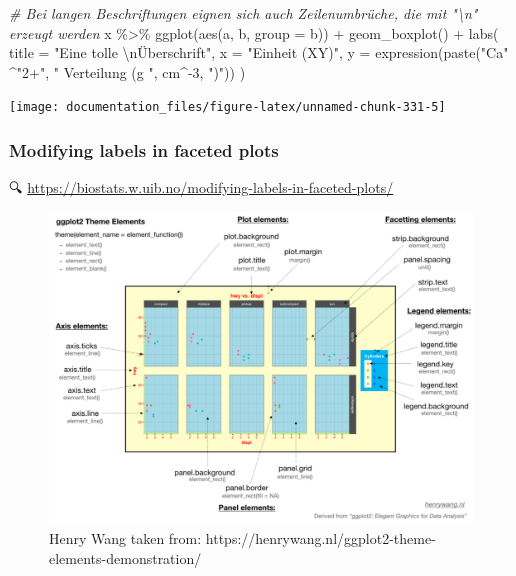 \documentclass[
]{article}
\newenvironment{Shaded}{\begin{snugshade}}{\end{snugshade}}
\newcommand{\AttributeTok}[1]{\textcolor[rgb]{0.77,0.63,0.00}{#1}}
\newcommand{\CommentTok}[1]{\textcolor[rgb]{0.56,0.35,0.01}{\textit{#1}}}
\newcommand{\DecValTok}[1]{\textcolor[rgb]{0.00,0.00,0.81}{#1}}
\newcommand{\FunctionTok}[1]{\textcolor[rgb]{0.00,0.00,0.00}{#1}}
\newcommand{\NormalTok}[1]{#1}
\newcommand{\SpecialCharTok}[1]{\textcolor[rgb]{0.00,0.00,0.00}{#1}}
\newcommand{\StringTok}[1]{\textcolor[rgb]{0.31,0.60,0.02}{#1}}
\begin{document}
\begin{Shaded}
\begin{Highlighting}[]

\CommentTok{\# Bei langen Beschriftungen eignen sich auch Zeilenumbrüche, die mit "\textbackslash{}n" erzeugt werden}
\NormalTok{x }\SpecialCharTok{\%\textgreater{}\%}
  \FunctionTok{ggplot}\NormalTok{(}\FunctionTok{aes}\NormalTok{(a, b, }\AttributeTok{group =}\NormalTok{ b)) }\SpecialCharTok{+}
  \FunctionTok{geom\_boxplot}\NormalTok{() }\SpecialCharTok{+}
  \FunctionTok{labs}\NormalTok{(}
    \AttributeTok{title =} \StringTok{"Eine tolle }\SpecialCharTok{\textbackslash{}n}\StringTok{Überschrift"}\NormalTok{,}
    \AttributeTok{x =} \StringTok{"Einheit (XY)"}\NormalTok{,}
    \AttributeTok{y =} \FunctionTok{expression}\NormalTok{(}\FunctionTok{paste}\NormalTok{(}\StringTok{"Ca"} \SpecialCharTok{\^{}}\StringTok{"2+"}\NormalTok{, }\StringTok{" Verteilung (g "}\NormalTok{, cm}\SpecialCharTok{\^{}{-}}\DecValTok{3}\NormalTok{, }\StringTok{")"}\NormalTok{))}
\NormalTok{  )}
\end{Highlighting}
\end{Shaded}

\begin{center}\texttt{[image: documentation\_files/figure-latex/unnamed-chunk-331-5]} \end{center}

\hypertarget{modifying-labels-in-faceted-plots}{%
\subsubsection{Modifying labels in faceted plots}\label{modifying-labels-in-faceted-plots}}

🔍 \url{https://biostats.w.uib.no/modifying-labels-in-faceted-plots/}

\begin{figure}

{\centering \includegraphics[width=1\linewidth]{images/048} 

}

\caption{Henry Wang taken from: https://henrywang.nl/ggplot2-theme-elements-demonstration/}\label{fig:unnamed-chunk-332}
\end{figure}
\end{document}
